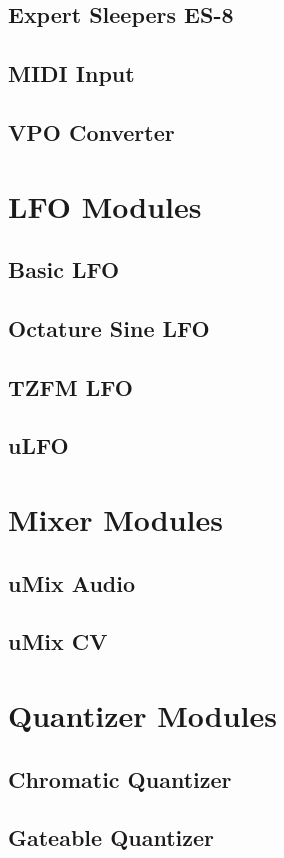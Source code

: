 \documentclass[11pt]{book}
\begin{document}
\section{Expert Sleepers ES-8}
\section{MIDI Input}
\section{VPO Converter}

\chapter{LFO Modules}
\section{Basic LFO}
\section{Octature Sine LFO}
\section{TZFM LFO}
\section{uLFO}

\chapter{Mixer Modules}
\section{uMix Audio}
\section{uMix CV}

\chapter{Quantizer Modules}
\section{Chromatic Quantizer}
\section{Gateable Quantizer}
\end{document}
